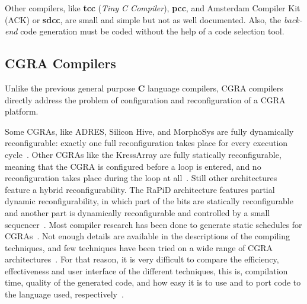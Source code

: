 \documentclass[journal]{IEEEtran}
\begin{document}
Other compilers, like {\bf tcc} ({\em Tiny C Compiler}), {\bf pcc}, and
Amsterdam Compiler Kit ({\sc ACK}) or {\bf sdcc}, are small and simple but
not as well documented.
Also, the {\it back-end} code generation must be coded without the help of a
code selection tool.

\subsection{{\sc CGRA} Compilers}

Unlike the previous general purpose {\bf C} language compilers, {\sc CGRA}
compilers directly address the problem of configuration and reconfiguration of a
{\sc CGRA} platform.

Some {\sc CGRAs}, like {\sc ADRES}, Silicon Hive, and MorphoSys are fully
dynamically reconfigurable: exactly one full reconfiguration takes place for
every execution cycle~\cite{DeSutter2010}.  Other {\sc CGRAs} like the
KressArray are fully statically reconfigurable, meaning that the {\sc CGRA} is
configured before a loop is entered, and no reconfiguration takes place during
the loop at all~\cite{DeSutter2010}.  Still other architectures feature a hybrid
reconfigurability. The RaPiD architecture features partial dynamic
reconfigurability, in which part of the bits are statically reconfigurable and
another part is dynamically reconfigurable and controlled by a small
sequencer~\cite{DeSutter2010}.  Most compiler research has been done to generate
static schedules for {\sc CGRAs}~\cite{DeSutter2010}.  Not enough details are
available in the descriptions of the compiling techniques, and few techniques
have been tried on a wide range of {\sc CGRA} architectures~\cite{DeSutter2010}.
For that reason, it is very difficult to compare the efficiency, effectiveness
and user interface of the different techniques, this is, compilation time,
quality of the generated code, and how easy it is to use and to port code to the
language used, respectively~\cite{Tuhin08}.
\end{document}
